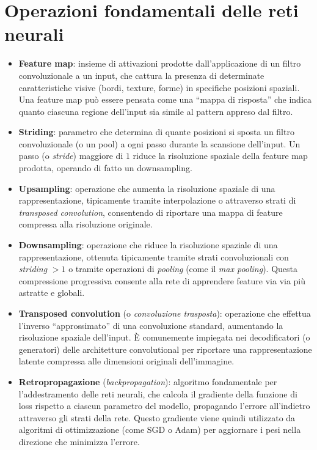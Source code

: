 \section{Operazioni fondamentali delle reti neurali}
\label{sec:def-ops-reti}
\begin{itemize}
	\item \textbf{Feature map}: insieme di attivazioni prodotte dall'applicazione di un filtro convoluzionale a un input, che cattura la presenza di determinate caratteristiche visive (bordi, texture, forme) in specifiche posizioni spaziali. Una feature map può essere pensata come una ``mappa di risposta'' che indica quanto ciascuna regione dell'input sia simile al pattern appreso dal filtro.
	\item \textbf{Striding}: parametro che determina di quante posizioni si sposta un filtro convoluzionale (o un pool) a ogni passo durante la scansione dell'input. Un passo (o \emph{stride}) maggiore di $1$ riduce la risoluzione spaziale della feature map prodotta, operando di fatto un downsampling.
	\item \textbf{Upsampling}: operazione che aumenta la risoluzione spaziale di una rappresentazione, tipicamente tramite interpolazione o attraverso strati di \emph{transposed convolution}, consentendo di riportare una mappa di feature compressa alla risoluzione originale.
	\item \textbf{Downsampling}: operazione che riduce la risoluzione spaziale di una rappresentazione, ottenuta tipicamente tramite strati convoluzionali con \emph{striding} $>1$ o tramite operazioni di \emph{pooling} (come il \emph{max pooling}). Questa compressione progressiva consente alla rete di apprendere feature via via più astratte e globali.
	\item \textbf{Transposed convolution} (o \emph{convoluzione trasposta}): operazione che effettua l'inverso ``approssimato'' di una convoluzione standard, aumentando la risoluzione spaziale dell'input. È comunemente impiegata nei decodificatori (o generatori) delle architetture convolutional per riportare una rappresentazione latente compressa alle dimensioni originali dell'immagine.
	\item \textbf{Retropropagazione} (\emph{backpropagation}): algoritmo fondamentale per l'addestramento delle reti neurali, che calcola il gradiente della funzione di loss rispetto a ciascun parametro del modello, propagando l'errore all'indietro attraverso gli strati della rete. Questo gradiente viene quindi utilizzato da algoritmi di ottimizzazione (come SGD o Adam) per aggiornare i pesi nella direzione che minimizza l'errore.

\end{itemize}
